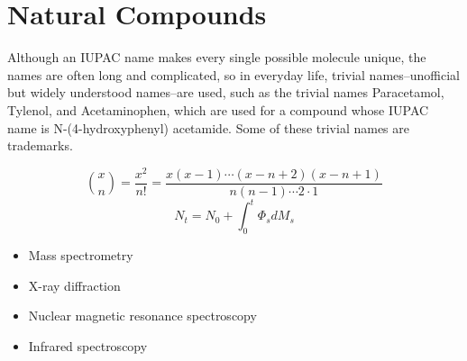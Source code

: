 \documentclass{beamer}
\begin{document}
\section{Natural Compounds}
\begin{frame}
	Although an IUPAC name makes every single possible molecule unique, the names are often long and complicated, 
	so in everyday life, trivial names--unofficial but widely understood names--are used, such as the trivial 
	names Paracetamol, Tylenol, and Acetaminophen, which are used for a compound whose IUPAC name is 
	N-(4-hydroxyphenyl) acetamide. Some of these trivial names are trademarks.

	\begin{figure}
	\begin{equation}
		\binom{x}{n} = \frac{x^2}{n!} = \frac{x(x-1) \cdots (x-n+2)(x-n+1)}{n(n-1) \cdots 2 \cdot1}
	\end{equation}
	\begin{equation}
		N_{t} = N_{0} + \int_{0}^{t} \Phi_{s} dM_{s}
	\end{equation}
	\end{figure}

\end{frame}
\begin{frame}
	\begin{itemize}
		\item Mass spectrometry
		\item X-ray diffraction
		\item Nuclear magnetic resonance spectroscopy
		\item Infrared spectroscopy
	\end{itemize}
\end{frame}


\end{document}

